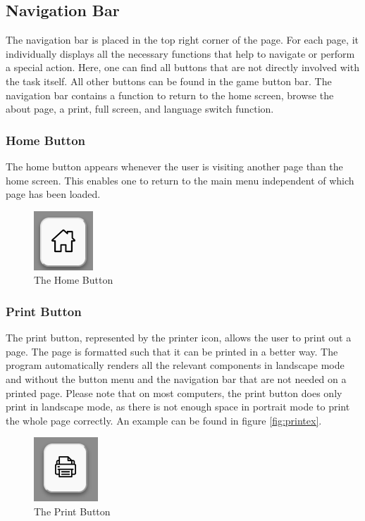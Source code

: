 \subsection{Navigation Bar}
The navigation bar is placed in the top right corner of the page. For each page, it individually displays all the necessary functions that help to navigate or perform a special action. Here, one can find all buttons that are not directly involved with the task itself. All other buttons can be found in the game button bar. The navigation bar contains a function to return to the home screen, browse the about page, a print, full screen, and language switch function.

\subsubsection{Home Button}
The home button appears whenever the user is visiting another page than the home screen. This enables one to return to the main menu independent of which page has been loaded.


\begin{figure}[h]
    \centering
    \includegraphics[width=0.2 \columnwidth]{figures/home.png}
    \caption{The Home Button} 
    \label{fig:next} 
\end{figure}

\subsubsection{Print Button}
The print button, represented by the printer icon, allows the user to print out a page. The page is formatted such that it can be printed in a better way. The program automatically renders all the relevant components in landscape mode and without the button menu and the navigation bar that are not needed on a printed page. Please note that on most computers, the print button does only print in landscape mode, as there is not enough space in portrait mode to print the whole page correctly. An example can be found in figure \ref{fig:printex}.

\begin{figure}[h]
    \centering
    \includegraphics[width=0.2 \columnwidth]{figures/print.png}
    \caption{The Print Button} 
    \label{fig:next} 
\end{figure}

